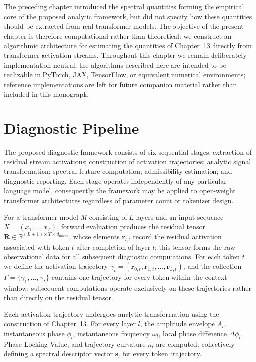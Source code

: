 \documentclass[11pt,twoside,openright]{book}
\numberwithin{equation}{chapter}
\theoremstyle{definition}
\theoremstyle{plain}
\theoremstyle{remark}
\theoremstyle{definition}
\begin{document}
The preceding chapter introduced the spectral quantities forming the
empirical core of the proposed analytic framework, but did not specify
how these quantities should be extracted from real transformer models.
The objective of the present chapter is therefore computational rather
than theoretical: we construct an algorithmic architecture for estimating
the quantities of Chapter~13 directly from transformer activation
streams. Throughout this chapter we remain deliberately
implementation-neutral; the algorithms described here are intended to be
realizable in PyTorch, JAX, TensorFlow, or equivalent numerical
environments; reference implementations are left for future companion
material rather than included in this monograph.

\section{Diagnostic Pipeline}

The proposed diagnostic framework consists of six sequential stages:
extraction of residual stream activations; construction of activation
trajectories; analytic signal transformation; spectral feature
computation; admissibility estimation; and diagnostic reporting. Each
stage operates independently of any particular language model,
consequently the framework may be applied to open-weight transformer
architectures regardless of parameter count or tokenizer design.

For a transformer model $M$ consisting of $L$ layers and an input
sequence $X=(x_1,\ldots,x_T)$, forward evaluation produces the residual
tensor $\mathbf{R}\in\mathbb{R}^{(L+1)\times T\times d_{\mathrm{model}}}$,
whose elements $\mathbf{r}_{l,t}$ record the residual activation
associated with token $t$ after completion of layer $l$; this tensor
forms the raw observational data for all subsequent diagnostic
computations. For each token $t$ we define the activation trajectory
$\gamma_t=(\mathbf{r}_{0,t},\mathbf{r}_{1,t},\ldots,\mathbf{r}_{L,t})$, and
the collection $\Gamma=\{\gamma_1,\ldots,\gamma_T\}$ contains one
trajectory for every token within the context window; subsequent
computations operate exclusively on these trajectories rather than
directly on the residual tensor.

Each activation trajectory undergoes analytic transformation using the
construction of Chapter~13. For every layer $l$, the amplitude envelope
$A_l$, instantaneous phase $\phi_l$, instantaneous frequency $\omega_l$,
local phase difference $\Delta\phi_l$, Phase Locking Value, and trajectory
curvature $\kappa_l$ are computed, collectively defining a spectral
descriptor vector $\mathbf{s}_t$ for every token trajectory.
\end{document}

